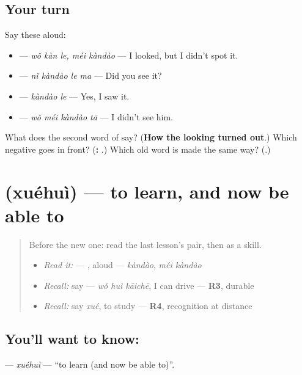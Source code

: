 \subsection*{Your turn}
Say these aloud:

\begin{itemize}
\raggedright
  \item {}  — \emph{wǒ kàn le, méi kàndào} — I looked, but I didn't spot it.
  \item {} — \emph{nǐ kàndào le ma} — Did you see it?
  \item {} — \emph{kàndào le} — Yes, I saw it.
  \item {} — \emph{wǒ méi kàndào tā} — I didn't see him.
\end{itemize}

\begin{tcolorbox}[breakable,colback=teal!4,colframe=teal!35!black,title={Before you move on}]
What does the second word of  say? (\textbf{How the looking turned out}.) Which negative goes in front? (\textbf{: }.) Which old word is made the same way? (\textbf{}.)
\end{tcolorbox}
\section[\texorpdfstring{\zh{学会} (xuéhuì)}{学会 (xuéhuì)}]{ (xuéhuì) — to learn, and now be able to}

\label{lesson:ZH-C151-xuehui}



\begin{quote}
Before the new one: read the last lesson's pair, then  as a skill.

\begin{itemize}
\raggedright
  \item \emph{Read it:}  — , aloud — \emph{kàndào}, \emph{méi kàndào}
  \item \emph{Recall:} say  — \emph{wǒ huì kāichē}, I can drive — \textbf{R3}, durable
  \item \emph{Recall:} say \emph{xué}, to study — \textbf{R4}, recognition at distance
\end{itemize}
\end{quote}

\subsection*{You'll want to know: }
\textbf{} — \emph{xuéhuì} — \textquotedblleft{}to learn (and now be able to)\textquotedblright{}.


